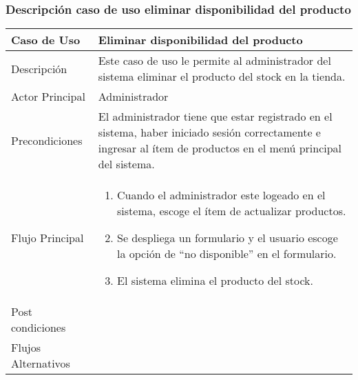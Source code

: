 \documentclass[12pt,a4paper]{article}
\begin{document}
        \newpage
\subsubsection*{Descripción caso de uso eliminar disponibilidad del producto}
\begin{table}[h]
        \centering
        \begin{tabular}{| p{3cm}| p{11cm} |} 
        \hline  
        Caso de Uso         &    \textbf{Eliminar disponibilidad del producto }   \\ 
        \hline
        Descripción         &    Este caso de uso le permite al administrador del sistema eliminar el producto del stock en la tienda.   \\ 
        \hline
        Actor Principal     &   Administrador   \\ 
        \hline
        Precondiciones      &  El administrador tiene que estar registrado en el sistema, haber iniciado sesión correctamente e ingresar al ítem de productos en el menú principal del sistema.   	\\
        \hline
        Flujo Principal     &    

            \begin{enumerate}
                \item Cuando el administrador este logeado en el sistema, escoge el ítem de actualizar productos.
                \item Se despliega un formulario y el usuario escoge la opción de “no disponible” en el formulario.
                \item El sistema elimina el producto del stock.
            \end{enumerate}
        \\  
        \hline
        Post condiciones    &       \\  
        \hline
        Flujos Alternativos &       \\  
        \hline
        \end{tabular}
    \end{table}

    \newpage
\end{document}
